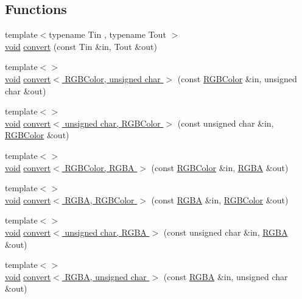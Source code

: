 \subsection*{Functions}
\begin{DoxyCompactItemize}
\item 
{\footnotesize template$<$typename Tin , typename Tout $>$ }\\\hyperlink{png_8h_aa8c59027f9ab2769342f248709d68d17}{void} \hyperlink{namespacelibs_abeed587537acb94f0038d4c685f80709}{convert} (const Tin \&in, Tout \&out)
\item 
{\footnotesize template$<$$>$ }\\\hyperlink{png_8h_aa8c59027f9ab2769342f248709d68d17}{void} \hyperlink{namespacelibs_a8bd7dd261917146af19dc8515d507c88}{convert$<$ R\+G\+B\+Color, unsigned char $>$} (const \hyperlink{pixelTypes_8hpp_a0bffee690fce7a74e4191ec31022d33b}{R\+G\+B\+Color} \&in, unsigned char \&out)
\item 
{\footnotesize template$<$$>$ }\\\hyperlink{png_8h_aa8c59027f9ab2769342f248709d68d17}{void} \hyperlink{namespacelibs_abd6874a8980e98cf69eacdb7f91b5454}{convert$<$ unsigned char, R\+G\+B\+Color $>$} (const unsigned char \&in, \hyperlink{pixelTypes_8hpp_a0bffee690fce7a74e4191ec31022d33b}{R\+G\+B\+Color} \&out)
\item 
{\footnotesize template$<$$>$ }\\\hyperlink{png_8h_aa8c59027f9ab2769342f248709d68d17}{void} \hyperlink{namespacelibs_a35ff8b219d74a9221bfff6a9e1703994}{convert$<$ R\+G\+B\+Color, R\+G\+B\+A $>$} (const \hyperlink{pixelTypes_8hpp_a0bffee690fce7a74e4191ec31022d33b}{R\+G\+B\+Color} \&in, \hyperlink{classRGBA}{R\+G\+B\+A} \&out)
\item 
{\footnotesize template$<$$>$ }\\\hyperlink{png_8h_aa8c59027f9ab2769342f248709d68d17}{void} \hyperlink{namespacelibs_aadc66f050a856edeaf0c8c69edd13d85}{convert$<$ R\+G\+B\+A, R\+G\+B\+Color $>$} (const \hyperlink{classRGBA}{R\+G\+B\+A} \&in, \hyperlink{pixelTypes_8hpp_a0bffee690fce7a74e4191ec31022d33b}{R\+G\+B\+Color} \&out)
\item 
{\footnotesize template$<$$>$ }\\\hyperlink{png_8h_aa8c59027f9ab2769342f248709d68d17}{void} \hyperlink{namespacelibs_a8e80ce60fb6e92926e78291d51102928}{convert$<$ unsigned char, R\+G\+B\+A $>$} (const unsigned char \&in, \hyperlink{classRGBA}{R\+G\+B\+A} \&out)
\item 
{\footnotesize template$<$$>$ }\\\hyperlink{png_8h_aa8c59027f9ab2769342f248709d68d17}{void} \hyperlink{namespacelibs_a699584c1505cae18fdaf41ad62c7c950}{convert$<$ R\+G\+B\+A, unsigned char $>$} (const \hyperlink{classRGBA}{R\+G\+B\+A} \&in, unsigned char \&out)

\end{DoxyCompactItemize}
